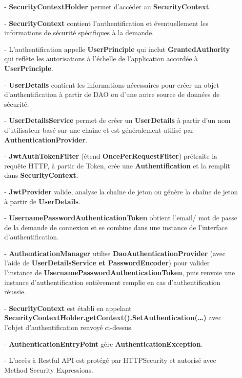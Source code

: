 \begin{itemize}
    \item[-]\textbf{SecurityContextHolder} permet d'accéder au \textbf{SecurityContext}.
    \item[-] \textbf{SecurityContext} contient l'authentification et éventuellement les informations de sécurité spécifiques à la demande.
    \item[-]	L'authentification appelle \textbf{UserPrinciple} qui inclut \textbf{GrantedAuthority} qui reflète les autorisations à l'échelle de l'application accordée à \textbf{UserPrinciple}.
    \item[-]\textbf{UserDetails} contient les informations nécessaires pour créer un objet d'authentification à partir de DAO ou d'une autre source de données de sécurité.
    \item[-]\textbf{UserDetailsService} permet de créer un \textbf{UserDetails} à partir d'un nom d'utilisateur basé sur une chaîne et est généralement utilisé par \textbf{AuthenticationProvider}.
    \item[-]\textbf{JwtAuthTokenFilter} (étend \textbf{OncePerRequestFilter}) prétraite la requête HTTP, à partir de Token, crée une \textbf{Authentification} et la remplit dans \textbf{SecurityContext}.
    \item[-]\textbf{JwtProvider} valide, analyse la chaîne de jeton ou génère la chaîne de jeton à partir de \textbf{UserDetails}.
    \item[-]\textbf{UsernamePasswordAuthenticationToken} obtient l’email/ mot de passe de la demande de connexion et se combine dans une instance de l'interface d'authentification.
    \item[-]\textbf{AuthenticationManager} utilise \textbf{DaoAuthenticationProvider} (avec l'aide de \textbf{UserDetailsService et PasswordEncoder}) pour valider l'instance de \textbf{UsernamePasswordAuthenticationToken}, puis renvoie une instance d'authentification entièrement remplie en cas d'authentification réussie.
    \item[-]\textbf{SecurityContext} est établi en appelant \newline \textbf{SecurityContextHolder.getContext().SetAuthentication(…)} avec l'objet d'authentification renvoyé ci-dessus.
    \item[-]\textbf{AuthenticationEntryPoint} gère \textbf{AuthenticationException}.
    \item[-]L'accès à Restful API est protégé par HTTPSecurity et autorisé avec Method Security Expressions.
\end{itemize}

